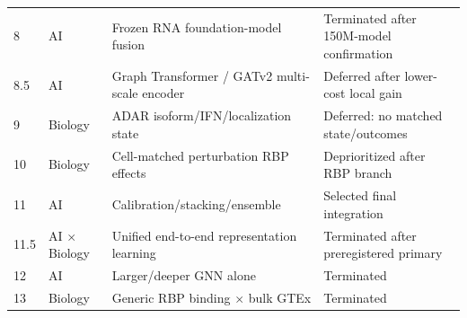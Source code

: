 \begin{longtable}{p{}p{}p{}p{}}
8 & AI & Frozen RNA foundation-model fusion & Terminated after 150M-model confirmation \\
8.5 & AI & Graph Transformer / GATv2 multi-scale encoder & Deferred after lower-cost local gain \\
9 & Biology & ADAR isoform/IFN/localization state & Deferred: no matched state/outcomes \\
10 & Biology & Cell-matched perturbation RBP effects & Deprioritized after RBP branch \\
11 & AI & Calibration/stacking/ensemble & Selected final integration \\
11.5 & AI $\times$ Biology & Unified end-to-end representation learning & Terminated after preregistered primary \\
12 & AI & Larger/deeper GNN alone & Terminated \\
13 & Biology & Generic RBP binding $\times$ bulk GTEx & Terminated \\
\bottomrule
\end{longtable}

